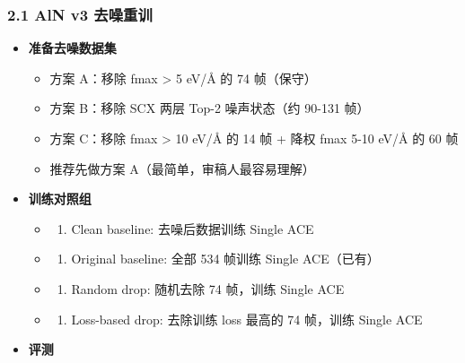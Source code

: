 \documentclass[
  12pt,
]{ctexart}
\providecommand{\tightlist}{%
  \setlength{\itemsep}{0pt}\setlength{\parskip}{0pt}}
\begin{document}
\subsubsection{2.1 AlN v3
去噪重训}\label{aln-v3-ux53bbux566aux91cdux8bad}

\begin{itemize}
\tightlist
\item[$\square$]
  \textbf{准备去噪数据集}

  \begin{itemize}
  \tightlist
  \item
    方案 A：移除 fmax \textgreater{} 5 eV/Å 的 74 帧（保守）
  \item
    方案 B：移除 SCX 两层 Top-2 噪声状态（约 90-131 帧）
  \item
    方案 C：移除 fmax \textgreater{} 10 eV/Å 的 14 帧 + 降权 fmax 5-10
    eV/Å 的 60 帧
  \item
    推荐先做方案 A（最简单，审稿人最容易理解）
  \end{itemize}
\item[$\square$]
  \textbf{训练对照组}

  \begin{itemize}
  \tightlist
  \item
    \begin{enumerate}
    \def\labelenumi{(\alph{enumi})}
    \tightlist
    \item
      Clean baseline: 去噪后数据训练 Single ACE
    \end{enumerate}
  \item
    \begin{enumerate}
    \def\labelenumi{(\alph{enumi})}
    \setcounter{enumi}{1}
    \tightlist
    \item
      Original baseline: 全部 534 帧训练 Single ACE（已有）
    \end{enumerate}
  \item
    \begin{enumerate}
    \def\labelenumi{(\alph{enumi})}
    \setcounter{enumi}{2}
    \tightlist
    \item
      Random drop: 随机去除 74 帧，训练 Single ACE
    \end{enumerate}
  \item
    \begin{enumerate}
    \def\labelenumi{(\alph{enumi})}
    \setcounter{enumi}{3}
    \tightlist
    \item
      Loss-based drop: 去除训练 loss 最高的 74 帧，训练 Single ACE
    \end{enumerate}
  \end{itemize}
\item[$\square$]
  \textbf{评测}


\end{itemize}
\end{document}
